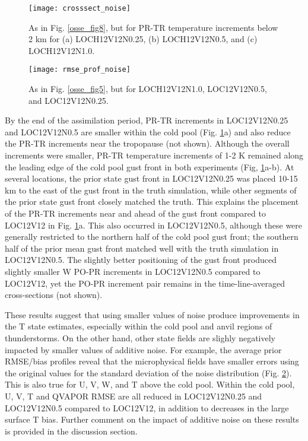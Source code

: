 \begin{figure}
\centering
\texttt{[image: crosssect\_noise]}
\caption{As in Fig. \ref{osse_fig8}, but for PR-TR temperature increments below 2 km for (a) LOCH12V12N0.25, (b) LOCH12V12N0.5, and (c) LOCH12V12N1.0.}
\label{osse_addnoise}
\end{figure}

\begin{figure}
\centering
\texttt{[image: rmse\_prof\_noise]}
\caption{As in Fig. \ref{osse_fig5}, but for LOCH12V12N1.0, LOC12V12N0.5, and LOC12V12N0.25.}
\label{osse_addnoise2}
\end{figure}

By the end of the assimilation period, PR-TR increments in LOC12V12N0.25 and LOC12V12N0.5 are smaller within the cold pool (Fig. \ref{osse_addnoise}a) and also reduce the PR-TR increments near the tropopause (not shown). Although the overall increments were smaller, PR-TR temperature increments of 1-2 K remained along the leading edge of the cold pool gust front in both experiments (Fig, \ref{osse_addnoise}a-b). At several locations, the prior state gust front in LOC12V12N0.25 was placed 10-15 km to the east of the gust front in the truth simulation, while other segments of the prior state gust front closely matched the truth. This explains the placement of the PR-TR increments near and ahead of the gust front compared to LOC12V12 in Fig. \ref{osse_addnoise}a. This also occurred in LOC12V12N0.5, although these were generally restricted to the northern half of the cold pool gust front; the southern half of the prior mean gust front matched well with the truth simulation in LOC12V12N0.5. The slightly better positioning of the gust front produced slightly smaller W PO-PR increments in LOC12V12N0.5 compared to LOC12V12, yet the PO-PR increment pair remains in the time-line-averaged cross-sections (not shown). 

These results suggest that using smaller values of noise produce improvements in the T state estimates, especially within the cold pool and anvil regions of thunderstorms. On the other hand, other state fields are slighly negatively impacted by smaller values of additive noise. For example, the average prior RMSE/bias profiles reveal that the microphysical fields have smaller errors using the original values for the standard deviation of the noise distribution (Fig. \ref{osse_addnoise2}). This is also true for U, V, W, and T above the cold pool. Within the cold pool, U, V, T and QVAPOR RMSE are all reduced in LOC12V12N0.25 and LOC12V12N0.5 compared to LOC12V12, in addition to decreases in the large surface T bias. Further comment on the impact of additive noise on these results is provided in the discussion section.

